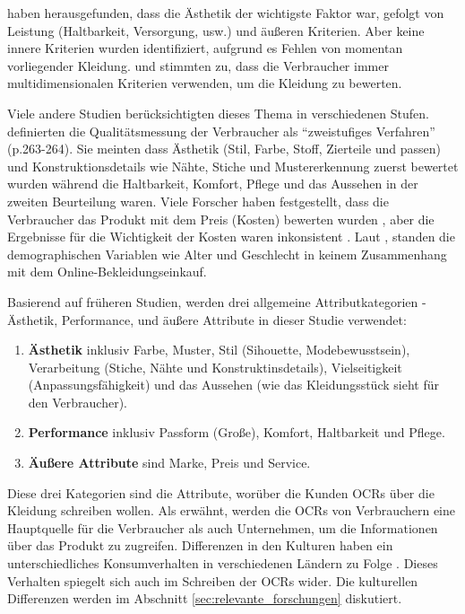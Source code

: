\citet{swinker2006understanding} haben herausgefunden, dass die Ästhetik der wichtigste Faktor war, gefolgt von Leistung (Haltbarkeit, Versorgung, \ac{usw}.) und äußeren Kriterien. Aber keine innere Kriterien wurden identifiziert, aufgrund es Fehlen von momentan vorliegender Kleidung. \citet{abraham1995consumers} und \citet{swinker2006understanding} stimmten zu, dass die Verbraucher immer multidimensionalen Kriterien verwenden, um die Kleidung zu bewerten.

Viele andere Studien berücksichtigten dieses Thema in verschiedenen Stufen. \citet{rosenau2014apparel} definierten die Qualitätsmessung der Verbraucher als ``zweistufiges Verfahren'' (p.263-264). Sie meinten dass Ästhetik (Stil, Farbe, Stoff, Zierteile und passen) und Konstruktionsdetails wie Nähte, Stiche und Mustererkennung zuerst bewertet wurden während die Haltbarkeit, Komfort, Pflege und das Aussehen in der zweiten Beurteilung waren. Viele Forscher haben festgestellt, dass die Verbraucher das Produkt mit dem Preis (Kosten) bewerten wurden \citep{keller2011strategic, kadolph2007quality}, aber die Ergebnisse für die Wichtigkeit der Kosten waren inkonsistent \citep{lu2015understanding}. Laut \citet{Goldsmith2002}, standen die demographischen Variablen wie Alter und Geschlecht in keinem Zusammenhang mit dem Online-Bekleidungseinkauf.

Basierend auf früheren Studien, werden drei allgemeine Attributkategorien - Ästhetik, Performance, und äußere Attribute in dieser Studie verwendet:
\begin{enumerate}
	\item \textbf{Ästhetik} inklusiv Farbe, Muster, Stil (Sihouette, Modebewusstsein), Verarbeitung (Stiche, Nähte und Konstruktinsdetails), Vielseitigkeit (Anpassungsfähigkeit) und das Aussehen (wie das Kleidungsstück sieht für den Verbraucher).
	\item \textbf{Performance} inklusiv Passform (Große), Komfort, Haltbarkeit und Pflege.
	\item \textbf{Äußere Attribute} sind Marke, Preis und Service.
\end{enumerate}

Diese drei Kategorien sind die Attribute, worüber die Kunden \ac{OCRs} über die Kleidung schreiben wollen. Als \citet{hu2008online} erwähnt, werden die \ac{OCRs} von Verbrauchern eine Hauptquelle für die Verbraucher als auch Unternehmen, um die Informationen über das Produkt zu zugreifen. Differenzen in den Kulturen haben ein unterschiedliches Konsumverhalten in verschiedenen Ländern zu Folge \citep{keller2011strategic}. Dieses Verhalten spiegelt sich auch im Schreiben der \ac{OCRs} wider. Die kulturellen Differenzen werden im Abschnitt \ref{sec:relevante_forschungen} diskutiert.
